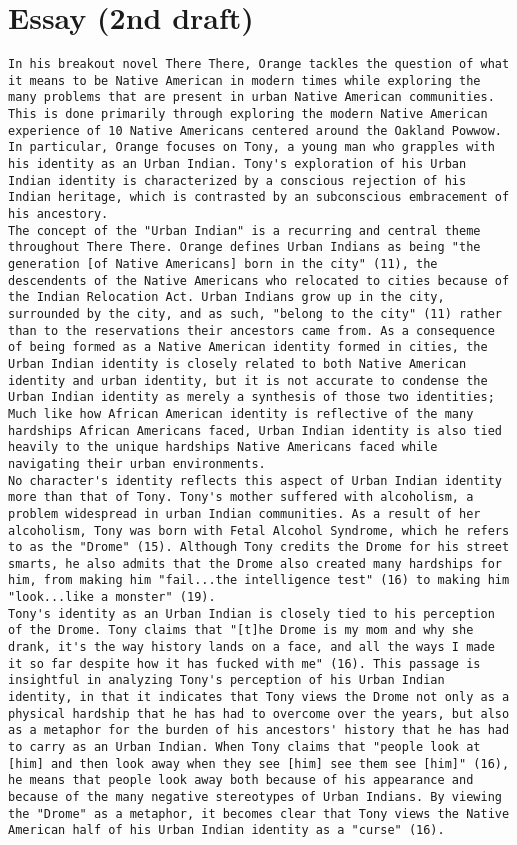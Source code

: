 \documentclass[letterpaper]{article}
\begin{document}
\section{Essay (2nd draft)}
\label{sec:org5ba2193}
\begin{verbatim}
In his breakout novel There There, Orange tackles the question of what it means to be Native American in modern times while exploring the many problems that are present in urban Native American communities. This is done primarily through exploring the modern Native American experience of 10 Native Americans centered around the Oakland Powwow. In particular, Orange focuses on Tony, a young man who grapples with his identity as an Urban Indian. Tony's exploration of his Urban Indian identity is characterized by a conscious rejection of his Indian heritage, which is contrasted by an subconscious embracement of his ancestory.
The concept of the "Urban Indian" is a recurring and central theme throughout There There. Orange defines Urban Indians as being "the generation [of Native Americans] born in the city" (11), the descendents of the Native Americans who relocated to cities because of the Indian Relocation Act. Urban Indians grow up in the city, surrounded by the city, and as such, "belong to the city" (11) rather than to the reservations their ancestors came from. As a consequence of being formed as a Native American identity formed in cities, the Urban Indian identity is closely related to both Native American identity and urban identity, but it is not accurate to condense the Urban Indian identity as merely a synthesis of those two identities; Much like how African American identity is reflective of the many  hardships African Americans faced, Urban Indian identity is also tied heavily to the unique hardships Native Americans faced while navigating their urban environments.
No character's identity reflects this aspect of Urban Indian identity more than that of Tony. Tony's mother suffered with alcoholism, a problem widespread in urban Indian communities. As a result of her alcoholism, Tony was born with Fetal Alcohol Syndrome, which he refers to as the "Drome" (15). Although Tony credits the Drome for his street smarts, he also admits that the Drome also created many hardships for him, from making him "fail...the intelligence test" (16) to making him "look...like a monster" (19).
Tony's identity as an Urban Indian is closely tied to his perception of the Drome. Tony claims that "[t]he Drome is my mom and why she drank, it's the way history lands on a face, and all the ways I made it so far despite how it has fucked with me" (16). This passage is insightful in analyzing Tony's perception of his Urban Indian identity, in that it indicates that Tony views the Drome not only as a physical hardship that he has had to overcome over the years, but also as a metaphor for the burden of his ancestors' history that he has had to carry as an Urban Indian. When Tony claims that "people look at [him] and then look away when they see [him] see them see [him]" (16), he means that people look away both because of his appearance and because of the many negative stereotypes of Urban Indians. By viewing the "Drome" as a metaphor, it becomes clear that Tony views the Native American half of his Urban Indian identity as a "curse" (16). 

\end{verbatim}
\end{document}
